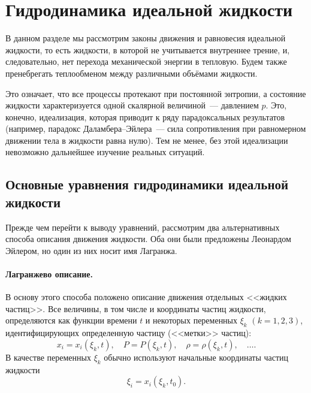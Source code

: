 \newpage
\section{Гидродинамика идеальной жидкости}
В  данном разделе мы рассмотрим законы движения и равновесия идеальной жидкости, то есть жидкости, в которой не учитывается внутреннее трение, и, следовательно, нет перехода механической энергии в тепловую. Будем также пренебрегать теплообменом между  различными объёмами жидкости.

Это означает, что все процессы протекают при постоянной энтропии, а состояние жидкости характеризуется одной скалярной величиной~---  давлением $p$. Это, конечно, идеализация, которая приводит к ряду парадоксальных результатов (например, парадокс  Даламбера--Эйлера~---  сила сопротивления при равномерном движении тела в жидкости равна нулю). Тем не менее, без этой идеализации невозможно дальнейшее изучение реальных ситуаций.

\subsection[Основные уравнения гидродинамики\newline идеальной жидкости]{Основные уравнения гидродинамики идеальной жидкости}
Прежде чем перейти к выводу уравнений, рассмотрим два альтернативных способа описания движения жидкости. Оба они были предложены Леонардом Эйлером, но один из них носит имя Лагранжа.

\paragraph{Лагранжево описание.} В основу этого способа положено описание движения отдельных <<жидких частиц>>. Все величины, в том числе и  координаты частиц жидкости, определяются как функции времени $t$  и некоторых переменных $\xi_k$ $(k=1,2,3)$, идентифицирующих определенную частицу (<<метки>> частиц):
\begin{equation}
	x_i =x_i(\xi_k,t), \quad
	P =P(\xi_k,t), \quad
	\rho = \rho(\xi_k,t), \quad \ldots.
\end{equation}
В качестве переменных $\xi_k$ обычно используют начальные координаты частиц жидкости
\begin{equation}
	\xi_i = x_i(\xi_k, t_0).
\end{equation}

